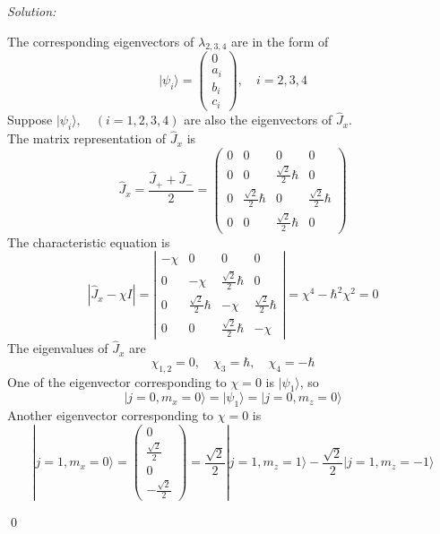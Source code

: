 \documentclass[10pt,a4paper]{article}
\newenvironment{sol}
    {\emph{Solution:}
    }
    {
    \qed
    }
\begin{document}
\begin{sol}
\begin{itemize}
The corresponding eigenvectors of $\lambda_{2,3,4}$ are in the form of
\begin{equation}
|\psi_i\rangle=\left(\begin{array}{c}
0\\
a_i\\
b_i\\
c_i
\end{array}\right),\quad i=2,3,4
\end{equation}
Suppose $|\psi_i\rangle,\quad(i=1,2,3,4)$ are also the eigenvectors of $\hat{J}_x$.\\
The matrix representation of $\hat{J}_x$ is
\begin{equation}
\hat{J}_x=\frac{\hat{J}_++\hat{J}_-}{2}=\left(\begin{array}{cccc}
0&0&0&0\\
0&0&\frac{\sqrt{2}}{2}\hbar&0\\
0&\frac{\sqrt{2}}{2}\hbar&0&\frac{\sqrt{2}}{2}\hbar\\
0&0&\frac{\sqrt{2}}{2}\hbar&0
\end{array}\right)
\end{equation}
The characteristic equation is
\begin{equation}
|\hat{J}_x-\chi I|=\left|\begin{array}{cccc}
-\chi&0&0&0\\
0&-\chi&\frac{\sqrt{2}}{2}\hbar&0\\
0&\frac{\sqrt{2}}{2}\hbar&-\chi&\frac{\sqrt{2}}{2}\hbar\\
0&0&\frac{\sqrt{2}}{2}\hbar&-\chi
\end{array}\right|=\chi^4-\hbar^2\chi^2=0
\end{equation}
The eigenvalues of $\hat{J}_x$ are
\begin{equation}
\chi_{1,2}=0,\quad\chi_3=\hbar,\quad\chi_4=-\hbar
\end{equation}
One of the eigenvector corresponding to $\chi=0$ is $|\psi_1\rangle$, so
\begin{equation}
|j=0,m_x=0\rangle=|\psi_1\rangle=|j=0,m_z=0\rangle
\end{equation}
Another eigenvector corresponding to $\chi=0$ is
\begin{equation}
|j=1,m_x=0\rangle=\left(\begin{array}{c}
0\\
\frac{\sqrt{2}}{2}\\
0\\
-\frac{\sqrt{2}}{2}
\end{array}\right)=\frac{\sqrt{2}}{2}|j=1,m_z=1\rangle-\frac{\sqrt{2}}{2}|j=1,m_z=-1\rangle

\end{equation}
\end{itemize}
\end{sol}
\end{document}
